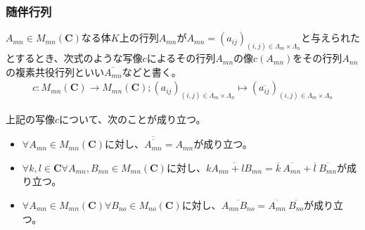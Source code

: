 \documentclass[dvipdfmx]{jsarticle}
\begin{document}
\subsubsection{随伴行列}%
\begin{dfn}
$A_{mn} \in M_{mn}\left( \mathbf{C} \right)$なる体$K$上の行列$A_{mn}$が$A_{mn} = \left( a_{ij} \right)_{(i,j) \in \varLambda_{m} \times \varLambda_{n}}$と与えられたとするとき、次式のような写像$c$によるその行列$A_{mn}$の像$c\left( A_{mn} \right)$をその行列$A_{nn}$の複素共役行列といい$\overline{A_{mn}}$などと書く。
\begin{align*}
c:M_{mn}\left( \mathbf{C} \right) \rightarrow M_{mn}\left( \mathbf{C} \right);\left( a_{ij} \right)_{(i,j) \in \varLambda_{m} \times \varLambda_{n}} \mapsto \left( \overline{a_{ij}} \right)_{(i,j) \in \varLambda_{m} \times \varLambda_{n}}
\end{align*}
\end{dfn}
\begin{thm}\label{2.1.3.9}
上記の写像$c$について、次のことが成り立つ。
\begin{itemize}
\item
  $\forall A_{mn} \in M_{mn}\left( \mathbf{C} \right)$に対し、$\overline{\overline{A_{mn}}} = A_{mn}$が成り立つ。
\item
  $\forall k,l \in \mathbf{C}\forall A_{mn},B_{mn} \in M_{mn}\left( \mathbf{C} \right)$に対し、$\overline{kA_{mn} + lB_{mn}} = \overline{k}\ \overline{A_{mn}} + \overline{l}\ \overline{B_{mn}}$が成り立つ。
\item
  $\forall A_{mn} \in M_{mn}\left( \mathbf{C} \right)\forall B_{no} \in M_{no}\left( \mathbf{C} \right)$に対し、$\overline{A_{mn}B_{no}} = \overline{A_{mn}}\ \overline{B_{no}}$が成り立つ。
\end{itemize}
\end{thm}
\end{document}
